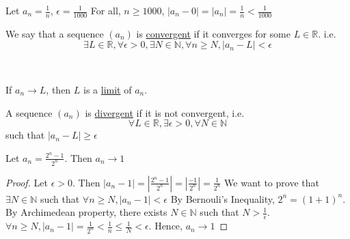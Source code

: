 \documentclass[11pt]{article}
\begin{document}
\begin{example}
	Let \(a_n = \frac{1}{n}\), \(\epsilon = \frac{1}{1000}\)
	For all, \(n \geqslant 1000\), \(|a_n - 0| = |a_n| = \frac{1}{n} < \frac{1}{1000}\)
\end{example}

\begin{center}
\end{center}
\begin{definition}
	We say that a sequence \((a_n)\) is \underline{convergent} if it converges for some \(L \in \mathbb{R}\). i.e.
	\[\exists L \in \mathbb{R}, \forall \epsilon > 0, \exists N \in \mathbb{N}, \forall n \geqslant N, \mid a_n - L \mid < \epsilon\]
\end{definition}\

\begin{definition}
	If \(a_n \rightarrow L\), then \(L\) is a \underline{limit} of \(a_n\).
\end{definition}

\begin{definition}
	A sequence \((a_n)\) is \underline{divergent} if it is not convergent, i.e.
	\[\forall L \in \mathbb{R}, \exists \epsilon > 0, \forall N \in \mathbb{N}\] such that \(|a_n - L| \geqslant \epsilon\)
\end{definition}

\begin{example}
	Let \(a_n = \frac{2^n - 1}{2^n}\). Then \(a_n \rightarrow 1\)
\end{example}
\begin{proof}
	Let \(\epsilon > 0\). Then \(|a_n - 1| = |\frac{2^n - 1}{2^n}| = |\frac{-1}{2^n}| = \frac{1}{2^n}\)
	We want to prove that \(\exists N \in \mathbb{N}\) such that \(\forall n \geqslant N, |a_n - 1| < \epsilon\)
	By Bernouli's Inequality, \(2^n = {(1 + 1)}^n.\)
	By Archimedean property, there exists \(N \in \mathbb{N}\) such that \(N > \frac{1}{\epsilon}\).
	\(\forall n \geqslant N, |a_n - 1| = \frac{1}{2^n} < \frac{1}{n} \leqslant \frac{1}{N} < \epsilon\). Hence, \(a_n \rightarrow 1\)
\end{proof}
\end{document}
